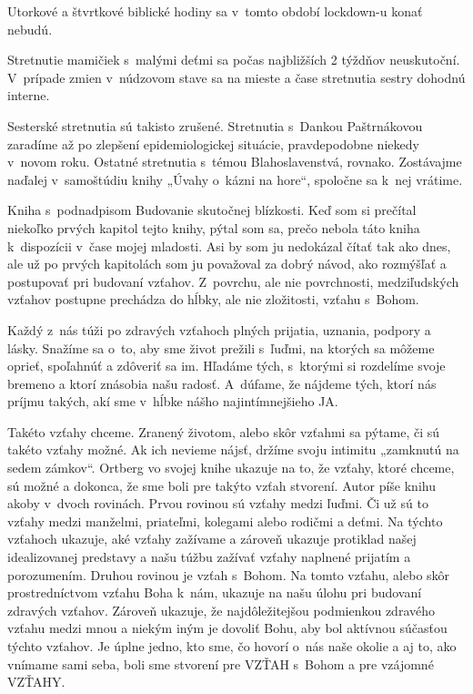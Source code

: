 Utorkové a štvrtkové biblické hodiny sa v~tomto období lockdown-u konať nebudú.


Stretnutie mamičiek s~malými deťmi sa počas najbližších 2 týždňov neuskutoční.
V~prípade zmien v~núdzovom stave sa na mieste a čase stretnutia sestry dohodnú interne.


Sesterské stretnutia sú takisto zrušené. Stretnutia s~Dankou Paštrnákovou zaradíme až po zlepšení epidemiologickej situácie, pravdepodobne niekedy v~novom roku. Ostatné stretnutia s~témou Blahoslavenstvá, rovnako. Zostávajme naďalej v~samoštúdiu knihy „Úvahy o~kázni na hore“, spoločne sa k~nej vrátime.


Kniha s~podnadpisom Budovanie skutočnej blízkosti.
Keď som si prečítal niekoľko prvých kapitol tejto knihy, pýtal som sa, prečo nebola táto kniha k~dispozícii v~čase mojej mladosti. Asi by som ju nedokázal čítať tak ako dnes, ale už po prvých kapitolách som ju považoval za dobrý návod, ako rozmýšľať a postupovať pri budovaní vzťahov. Z~povrchu, ale nie povrchnosti, medziľudských vzťahov postupne prechádza do hĺbky, ale nie zložitosti, vzťahu s~Bohom.

Každý z~nás túži po zdravých vzťahoch plných prijatia, uznania, podpory a lásky. Snažíme sa o~to, aby sme život prežili s~ľuďmi, na ktorých sa môžeme oprieť, spoľahnúť a zdôveriť sa im. Hľadáme tých, s~ktorými si rozdelíme svoje bremeno a ktorí znásobia našu radosť. A~dúfame, že nájdeme tých, ktorí nás príjmu takých, akí sme v~hĺbke nášho najintímnejšieho JA.

Takéto vzťahy chceme. Zranený životom, alebo skôr vzťahmi sa pýtame, či sú takéto vzťahy možné. Ak ich nevieme nájsť, držíme svoju intimitu „zamknutú na sedem zámkov“. Ortberg vo svojej knihe ukazuje na to, že vzťahy, ktoré chceme, sú možné a dokonca, že sme boli pre takýto vzťah stvorení.
Autor píše knihu akoby v~dvoch rovinách.
Prvou rovinou sú vzťahy medzi ľuďmi. Či už sú to vzťahy medzi manželmi, priateľmi, kolegami alebo rodičmi a deťmi. Na týchto vzťahoch ukazuje, aké vzťahy zažívame a zároveň ukazuje protiklad našej idealizovanej predstavy a našu túžbu zažívať vzťahy naplnené prijatím a porozumením.
Druhou rovinou je vzťah s~Bohom. Na tomto vzťahu, alebo skôr prostredníctvom vzťahu Boha k~nám, ukazuje na našu úlohu pri budovaní zdravých vzťahov. Zároveň ukazuje, že najdôležitejšou podmienkou zdravého vzťahu medzi mnou a niekým iným je dovoliť Bohu, aby bol aktívnou súčasťou týchto vzťahov.
Je úplne jedno, kto sme, čo hovorí o~nás naše okolie a aj to, ako vnímame sami seba, boli sme stvorení pre VZŤAH s~Bohom a pre vzájomné VZŤAHY.

